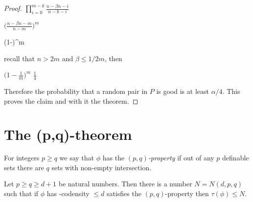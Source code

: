 \documentclass[scombinatorics.tex]{subfiles}
\begin{document}
\begin{proof}
\medrel{\ge}
$\displaystyle\prod^{m-k}_{i=0}\frac{n-\beta n-i}{n-k-i}$

\medrel{\ge}
$\displaystyle\bigg(\frac{n-\beta n-m}{n-m}\bigg)^m$

\ceq{}{=}
{\bigg(1-\bigg)^m}

\smallskip recall that $n>2m$ and $\beta\le1/2m$, then

\medrel{=}
$\displaystyle\bigg(1-\frac{1}{m}\bigg)^m$
\medrel{\ge}
$\displaystyle\frac{1}{4}$

Therefore the probability that a random pair in $P$ is good is at least $\alpha/4$.
This proves the claim and with it the theorem.
\end{proof}


\section{The (p,q)-theorem}

For integers $p\ge q$ we say that $\phi$ has the \emph{$(p,q)$-property\/} if out of any $p$ definable sets there are $q$ sets with non-empty intersection.

\begin{theorem} Let $p\ge q\ge d+1$ be natural numbers.
Then there is a number $N=N(d,p,q)$ such that if $\phi$ has \vc-codensity $\le d$  satisfies the $(p,q)$-property then $\tau(\phi)\le N$.
\end{theorem}
\end{document}
